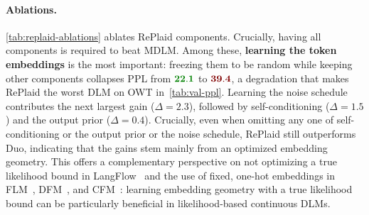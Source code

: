 \documentclass{article}
\begin{document}
\paragraph{Ablations.} \cref{tab:replaid-ablations} ablates RePlaid components. Crucially, having all components is required to beat MDLM. Among these, \textbf{learning the token embeddings} is the most important: freezing them to be random while keeping other components collapses PPL from $\mathbf{\color[rgb]{0, 0.5, 0}\replaidscppl}$ to $\mathbf{\color[rgb]{0.5, 0, 0}39.4}$, a degradation that makes RePlaid the worst DLM on OWT in~\cref{tab:val-ppl}. Learning the noise schedule contributes the next largest gain ($\Delta = 2.3$), followed by self-conditioning ($\Delta = 1.5$) and the output prior ($\Delta = 0.4$). Crucially, even when omitting any one of self-conditioning or the output prior or the noise schedule, RePlaid still outperforms Duo, indicating that the gains stem mainly from an optimized embedding geometry. This offers a complementary perspective on not optimizing a true likelihood bound in LangFlow~\citep{chen2026langflow} and the use of fixed, one-hot embeddings in FLM~\citep{lee2026flow}, DFM~\citep{potaptchik2026discrete}, and CFM~\citep{roos2026categorical}: learning embedding geometry with a true likelihood bound can be particularly beneficial in likelihood-based continuous DLMs.

%

%


%

%
%
%
%
%
%
%
%
%
%
%
%
%
%
%


%

%

%

%

%

%

%
%
%
%
%
%
%
%
%
%







%

%


%

%
%
%

%

%
%
%
%

%

%

%
%
%
%
%

%

%

%
\end{document}
